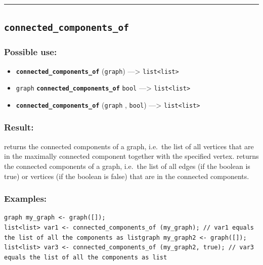 \documentclass[]{book}
\providecommand{\tightlist}{%
  \setlength{\itemsep}{0pt}\setlength{\parskip}{0pt}}
\theoremstyle{definition}
\theoremstyle{definition}
\theoremstyle{definition}
\theoremstyle{remark}
\begin{document}
\begin{center}\rule{0.5\linewidth}{\linethickness}\end{center}

\subsection{\texorpdfstring{\texttt{connected\_components\_of}}{connected\_components\_of}}\label{connected_components_of}

\subsubsection{Possible use:}\label{possible-use-96}

\begin{itemize}
\tightlist
\item
  \textbf{\texttt{connected\_components\_of}} (\texttt{graph})
  ---\textgreater{} \texttt{list\textless{}list\textgreater{}}
\item
  \texttt{graph} \textbf{\texttt{connected\_components\_of}}
  \texttt{bool} ---\textgreater{}
  \texttt{list\textless{}list\textgreater{}}
\item
  \textbf{\texttt{connected\_components\_of}} (\texttt{graph} ,
  \texttt{bool}) ---\textgreater{}
  \texttt{list\textless{}list\textgreater{}}
\end{itemize}

\subsubsection{Result:}\label{result-94}

returns the connected components of a graph, i.e.~the list of all
vertices that are in the maximally connected component together with the
specified vertex. returns the connected components of a graph, i.e.~the
list of all edges (if the boolean is true) or vertices (if the boolean
is false) that are in the connected components.

\subsubsection{Examples:}\label{examples-74}

\begin{verbatim}
graph my_graph <- graph([]);  
list<list> var1 <- connected_components_of (my_graph); // var1 equals the list of all the components as listgraph my_graph2 <- graph([]);  
list<list> var3 <- connected_components_of (my_graph2, true); // var3 equals the list of all the components as list
\end{verbatim}
\end{document}
